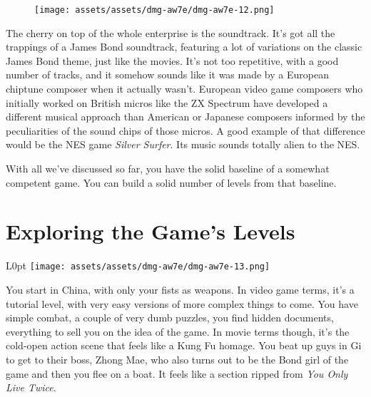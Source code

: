 \documentclass{book}
\begin{document}
\begin{figure}[hbt]
\vskip 10pt
\centering \texttt{[image: assets/assets/dmg-aw7e/dmg-aw7e-12.png]}
\vskip 6pt
\end{figure}
The cherry on top of the whole enterprise is the soundtrack. It’s got all the trappings of a James Bond soundtrack, featuring a lot of variations on the classic James Bond theme, just like the movies. It’s not too repetitive, with a good number of tracks, and it somehow sounds like it was made by a European chiptune composer when it actually wasn’t. European video game composers who initially worked on British micros like the ZX Spectrum have developed a different musical approach than American or Japanese composers informed by the peculiarities of the sound chips of those micros. A good example of that difference would be the NES game \emph{Silver Surfer}. Its music sounds totally alien to the NES.

With all we’ve discussed so far, you have the solid baseline of a somewhat competent game. You can build a solid number of levels from that baseline.

\FloatBarrier\needspace{5pt}\section*{Exploring the Game’s Levels}\nopagebreak[4]

\begin{wrapfigure}{L}{0pt} \texttt{[image: assets/assets/dmg-aw7e/dmg-aw7e-13.png]}\end{wrapfigure}
You start in China, with only your fists as weapons. In video game terms, it’s a tutorial level, with very easy versions of more complex things to come. You have simple combat, a couple of very dumb puzzles, you find hidden documents, everything to sell you on the idea of the game. In movie terms though, it’s the cold-open action scene that feels like a Kung Fu homage. You beat up guys in Gi to get to their boss, Zhong Mae, who also turns out to be the Bond girl of the game and then you flee on a boat. It feels like a section ripped from \emph{You Only Live Twice}.
\end{document}
